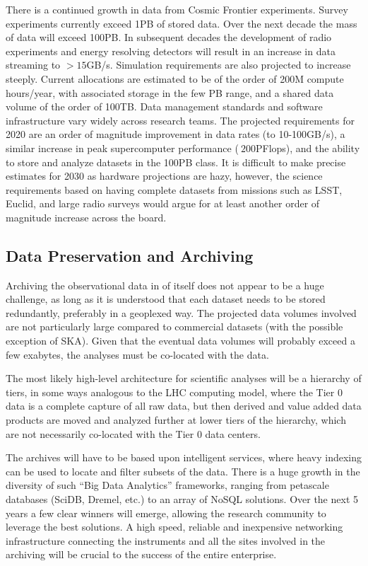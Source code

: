 There is a continued growth in data from Cosmic Frontier
experiments. Survey experiments currently exceed 1PB of stored
data. Over the next decade the mass of data will exceed 100PB. In
subsequent decades the development of radio experiments and energy
resolving detectors will result in an increase in data streaming to $>
15$GB/s. Simulation requirements are also projected to increase
steeply. Current allocations are estimated to be of the order of 200M
compute hours/year, with associated storage in the few PB range, and a
shared data volume of the order of 100TB. Data management standards
and software infrastructure vary widely across research teams. The
projected requirements for 2020 are an order of magnitude improvement
in data rates (to 10-100GB/s), a similar increase in peak
supercomputer performance ($~200$PFlops), and the ability to store and
analyze datasets in the 100PB class. It is difficult to make precise
estimates for 2030 as hardware projections are hazy, however, the
science requirements based on having complete datasets from missions
such as LSST, Euclid, and large radio surveys would argue for at least
another order of magnitude increase across the board.

\subsection{Data Preservation and Archiving}

Archiving the observational data in of itself does not appear to be a
huge challenge, as long as it is understood that each dataset needs
to be stored redundantly, preferably in a geoplexed way. The projected
data volumes involved are not particularly large compared to
commercial datasets (with the possible exception of SKA). Given that
the eventual data volumes will probably exceed a few exabytes, the
analyses must be co-located with the data.

The most likely high-level architecture for scientific analyses will
be a hierarchy of tiers, in some ways analogous to the LHC computing
model, where the Tier 0 data is a complete capture of all raw data,
but then derived and value added data products are moved and analyzed
further at lower tiers of the hierarchy, which are not necessarily
co-located with the Tier 0 data centers.

The archives will have to be based upon intelligent services, where
heavy indexing can be used to locate and filter subsets of the
data. There is a huge growth in the diversity of such ``Big Data
Analytics'' frameworks, ranging from petascale databases (SciDB,
Dremel, etc.) to an array of NoSQL solutions. Over the next 5 years a
few clear winners will emerge, allowing the research community to
leverage the best solutions. A high speed, reliable and
inexpensive networking infrastructure connecting the instruments and
all the sites involved in the archiving will be crucial to the success
of the entire enterprise.

